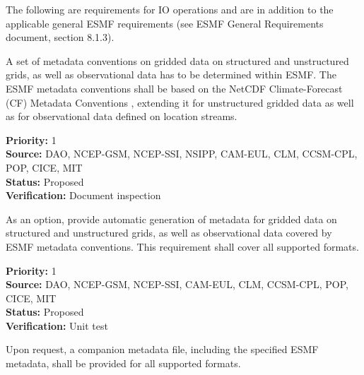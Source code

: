 

The following are requirements for IO operations and are in addition
to the applicable general ESMF requirements (see ESMF General 
Requirements document, section 8.1.3).



A set of metadata conventions on gridded data on structured and
unstructured grids, as well as observational data has to be determined
within ESMF. The ESMF metadata conventions shall be based on the
NetCDF Climate-Forecast (CF) Metadata Conventions
\cite{NetCDF_CF_v1_beta3}, extending it for unstructured gridded data
as well as for observational data defined on location streams.

\begin{reqlist}
{\bf Priority:} 1 \\
{\bf Source:} DAO, NCEP-GSM, NCEP-SSI, NSIPP, CAM-EUL, CLM, CCSM-CPL, POP, CICE, MIT \\
{\bf Status:} Proposed \\
{\bf Verification:} Document inspection \\
\end{reqlist}


As an option, provide automatic generation of metadata for gridded
data on structured and unstructured grids, as well as observational
data covered by ESMF metadata conventions. This requirement shall
cover all supported formats.

\begin{reqlist}
{\bf Priority:} 1 \\
{\bf Source:} DAO, NCEP-GSM, NCEP-SSI, CAM-EUL, CLM, CCSM-CPL, POP, CICE, MIT \\
{\bf Status:} Proposed \\
{\bf Verification:} Unit test \\
\end{reqlist}



Upon request, a companion metadata file, including the specified ESMF
metadata, shall be provided for all supported formats.

